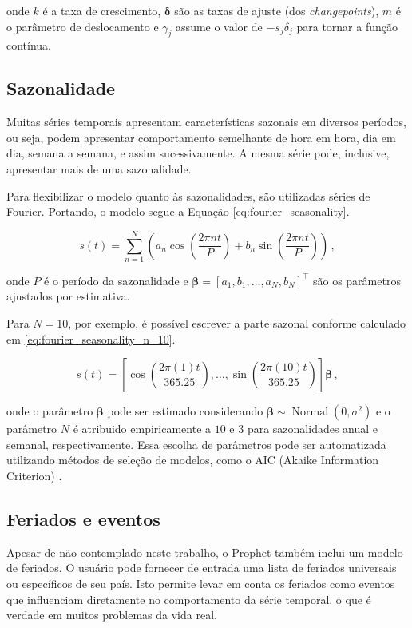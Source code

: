 onde $k$ é a taxa de crescimento, $\boldsymbol{\delta}$ são as taxas de ajuste (dos \textit{changepoints}), $m$ é o parâmetro de deslocamento e $\gamma_{j}$ assume o valor de $-s_{j}\delta_{j}$ para tornar a função contínua.

\subsection{Sazonalidade}
Muitas séries temporais apresentam características sazonais em diversos períodos, ou seja, podem apresentar comportamento semelhante de hora em hora, dia em dia, semana a semana, e assim sucessivamente. A mesma série pode, inclusive, apresentar mais de uma sazonalidade.

Para flexibilizar o modelo quanto às sazonalidades, são utilizadas séries de Fourier. Portando, o modelo segue a Equação \eqref{eq:fourier_seasonality}.

\begin{equation} \label{eq:fourier_seasonality}
    s(t)=\sum_{n=1}^{N}\left(a_{n} \cos \left(\frac{2 \pi n t}{P}\right)+b_{n} \sin \left(\frac{2 \pi n t}{P}\right)\right)\, ,
\end{equation}

onde $P$ é o período da sazonalidade e $\boldsymbol{\beta} = [a_{1},b_{1},\ldots,a_{N},b_{N}]^{\top}$ são os parâmetros ajustados por estimativa.

Para $N=10$, por exemplo, é possível escrever a parte sazonal conforme calculado em \eqref{eq:fourier_seasonality_n_10}.

\begin{equation} \label{eq:fourier_seasonality_n_10}
    s(t)=\left[\cos \left(\frac{2 \pi(1) t}{365.25}\right), \ldots, \sin \left(\frac{2 \pi(10) t}{365.25}\right)\right]\boldsymbol{\beta} \, ,
\end{equation}

onde o parâmetro $\boldsymbol{\beta}$ pode ser estimado considerando $\boldsymbol{\beta} \sim \operatorname{Normal}\left(0, \sigma^{2}\right)$ e o parâmetro $N$ é atribuido empiricamente a $10$ e $3$ para sazonalidades anual e semanal, respectivamente. Essa escolha de parâmetros pode ser automatizada utilizando métodos de seleção de modelos, como o AIC (Akaike Information Criterion) \cite{akaike}.

\subsection{Feriados e eventos}
Apesar de não contemplado neste trabalho, o Prophet também inclui um modelo de feriados. O usuário pode fornecer de entrada uma lista de feriados universais ou específicos de seu país. Isto permite levar em conta os feriados como eventos que influenciam diretamente no comportamento da série temporal, o que é verdade em muitos problemas da vida real.

